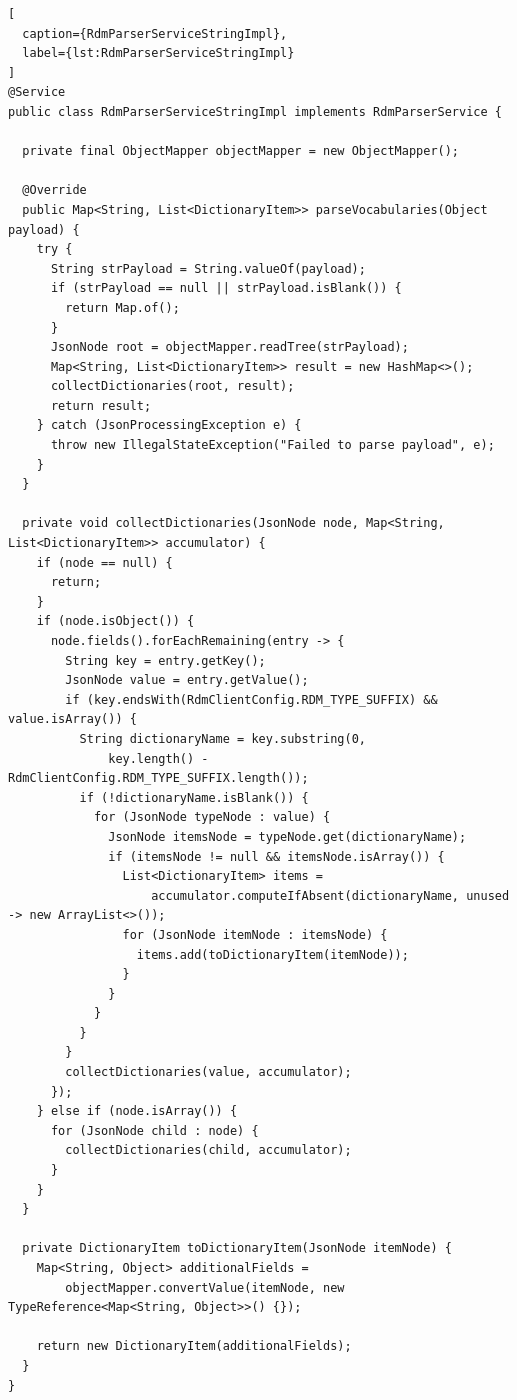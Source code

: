 \begin{lstlisting}[
  caption={RdmParserServiceStringImpl},
  label={lst:RdmParserServiceStringImpl}
]
@Service
public class RdmParserServiceStringImpl implements RdmParserService {

  private final ObjectMapper objectMapper = new ObjectMapper();

  @Override
  public Map<String, List<DictionaryItem>> parseVocabularies(Object payload) {
    try {
      String strPayload = String.valueOf(payload);
      if (strPayload == null || strPayload.isBlank()) {
        return Map.of();
      }
      JsonNode root = objectMapper.readTree(strPayload);
      Map<String, List<DictionaryItem>> result = new HashMap<>();
      collectDictionaries(root, result);
      return result;
    } catch (JsonProcessingException e) {
      throw new IllegalStateException("Failed to parse payload", e);
    }
  }

  private void collectDictionaries(JsonNode node, Map<String, List<DictionaryItem>> accumulator) {
    if (node == null) {
      return;
    }
    if (node.isObject()) {
      node.fields().forEachRemaining(entry -> {
        String key = entry.getKey();
        JsonNode value = entry.getValue();
        if (key.endsWith(RdmClientConfig.RDM_TYPE_SUFFIX) && value.isArray()) {
          String dictionaryName = key.substring(0, 
              key.length() - RdmClientConfig.RDM_TYPE_SUFFIX.length());
          if (!dictionaryName.isBlank()) {
            for (JsonNode typeNode : value) {
              JsonNode itemsNode = typeNode.get(dictionaryName);
              if (itemsNode != null && itemsNode.isArray()) {
                List<DictionaryItem> items =
                    accumulator.computeIfAbsent(dictionaryName, unused -> new ArrayList<>());
                for (JsonNode itemNode : itemsNode) {
                  items.add(toDictionaryItem(itemNode));
                }
              }
            }
          }
        }
        collectDictionaries(value, accumulator);
      });
    } else if (node.isArray()) {
      for (JsonNode child : node) {
        collectDictionaries(child, accumulator);
      }
    }
  }

  private DictionaryItem toDictionaryItem(JsonNode itemNode) {
    Map<String, Object> additionalFields =
        objectMapper.convertValue(itemNode, new TypeReference<Map<String, Object>>() {});

    return new DictionaryItem(additionalFields);
  }
}
\end{lstlisting}


